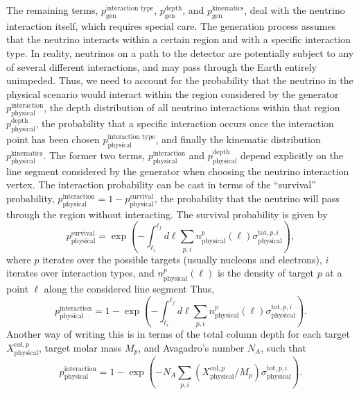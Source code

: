 \documentclass[main.tex]{subfiles}
\begin{document}
The remaining terms, $p_\textrm{gen}^\textrm{interaction type}$, $p_\textrm{gen}^\textrm{depth}$, and $p_\textrm{gen}^\textrm{kinematics}$, deal with the neutrino interaction itself, which requires special care.
The generation process assumes that the neutrino interacts within a certain region and with a specific interaction type.
In reality, neutrinos on a path to the detector are potentially subject to any of several different interactions, and may pass through the Earth entirely unimpeded.
Thus, we need to account for the probability that the neutrino in the physical scenario would interact within the region considered by the generator $p_\textrm{physical}^\textrm{interaction}$, the depth distribution of all neutrino interactions within that region $p_\textrm{physical}^\textrm{depth}$, the probability that a specific interaction occurs once the interaction point has been chosen $p_\textrm{physical}^\textrm{interaction type}$, and finally the kinematic distribution $p_\textrm{physical}^\textrm{kinematics}$.
The former two terms, $p_\textrm{physical}^\textrm{interaction}$ and $p_\textrm{physical}^\textrm{depth}$ depend explicitly on the line segment considered by the generator when choosing the neutrino interaction vertex.
The interaction probability can be cast in terms of the ``survival'' probability, $p_\textrm{physical}^\textrm{interaction} = 1-p_\textrm{physical}^\textrm{survival}$, the probability that the neutrino will pass through the region without interacting.
The survival probability is given by
\begin{equation}
p_\textrm{physical}^\textrm{survival} = \exp\left(-{\int_{\ell_i}^{\ell_f}{d\ell \sum_{p,i} n_\textrm{physical}^p(\ell) \sigma_\textrm{physical}^{\textrm{tot},p,i} }}\right),
\end{equation}
where $p$ iterates over the possible targets (usually nucleons and electrons), $i$ iterates over interaction types, and $n_\textrm{physical}^p(\ell)$ is the density of target $p$ at a point $\ell$ along the considered line segment
Thus,
\begin{equation}
p_\textrm{physical}^\textrm{interaction} = 1-\exp\left(-{\int_{\ell_i}^{\ell_f}{d\ell \sum_{p,i} n_\textrm{physical}^p(\ell) \sigma_\textrm{physical}^{\textrm{tot},p,i} }}\right).
\end{equation}
Another way of writing this is in terms of the total column depth for each target $X_\textrm{physical}^{\textrm{col}, p}$, target molar mass $M_p$, and Avagadro's number $N_A$, such that
\begin{equation}
p_\textrm{physical}^\textrm{interaction} = 1-\exp\left(-N_A{\sum_{p,i} (X_\textrm{physical}^{\textrm{col}, p}/M_p) \sigma_\textrm{physical}^{\textrm{tot},p,i} }\right).
\end{equation}
\end{document}
